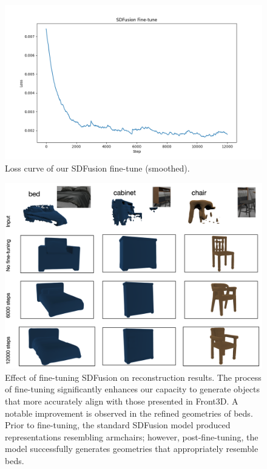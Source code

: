 \begin{figure}[h]
  \centering
\includegraphics[width=\linewidth]{figs/sdfusion_finetune_loss_plot.png}
  \caption{Loss curve of our SDFusion fine-tune (smoothed).}
\label{fig:finetune}
\end{figure}

\begin{figure}[h]
  \centering
\includegraphics[width=\linewidth]{images/image4.png}
  \caption{Effect of fine-tuning SDFusion on reconstruction results. The process of fine-tuning significantly enhances our capacity to generate objects that more accurately align with those presented in Front3D. A notable improvement is observed in the refined geometries of beds. Prior to fine-tuning, the standard SDFusion model produced representations resembling armchairs; however, post-fine-tuning, the model successfully generates geometries that appropriately resemble beds.}
  \label{fig:short-b}
\end{figure}

